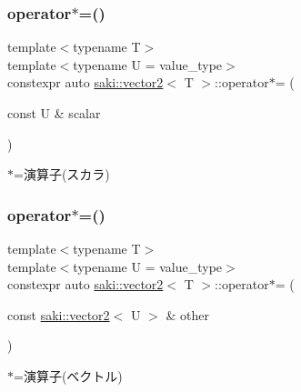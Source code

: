 \subsubsection{\texorpdfstring{operator$\ast$=()}{operator*=()}\hspace{0.1cm}{\footnotesize\ttfamily [1/2]}}
{\footnotesize\ttfamily template$<$typename T$>$ \\
template$<$typename U  = value\+\_\+type$>$ \\
constexpr auto \mbox{\hyperlink{classsaki_1_1vector2}{saki\+::vector2}}$<$ T $>$\+::operator$\ast$= (\begin{DoxyParamCaption}\item[{const U \&}]{scalar }\end{DoxyParamCaption})\hspace{0.3cm}{\ttfamily [inline]}}



$\ast$=演算子(スカラ) 

\mbox{\label{classsaki_1_1vector2_aec034723124adf2fd39736d4db3bb020}} 
\subsubsection{\texorpdfstring{operator$\ast$=()}{operator*=()}\hspace{0.1cm}{\footnotesize\ttfamily [2/2]}}
{\footnotesize\ttfamily template$<$typename T$>$ \\
template$<$typename U  = value\+\_\+type$>$ \\
constexpr auto \mbox{\hyperlink{classsaki_1_1vector2}{saki\+::vector2}}$<$ T $>$\+::operator$\ast$= (\begin{DoxyParamCaption}\item[{const \mbox{\hyperlink{classsaki_1_1vector2}{saki\+::vector2}}$<$ U $>$ \&}]{other }\end{DoxyParamCaption})\hspace{0.3cm}{\ttfamily [inline]}}



$\ast$=演算子(ベクトル) 

\mbox{\label{classsaki_1_1vector2_a860342168e4b74d2b3190d7383c144a5}} 

